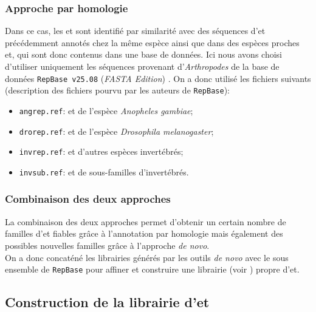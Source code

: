 \documentclass[10pt]{article}
\begin{document}
\subsubsection{Approche par homologie}\label{sec:homology}

Dans ce cas, les \acrshort{et} sont identifié par similarité avec des séquences d'\acrshort{et} précédemment annotés chez la même espèce ainsi que dans des espèces proches et, qui sont donc contenus dans une base de données. Ici nous avons choisi d'utiliser uniquement les séquences provenant d'\textit{Arthropodes} de la base de données \texttt{RepBase v25.08} (\textit{FASTA Edition}) \cite{jurka_repbase_2005}. On a donc utilisé les fichiers suivants (description des fichiers pourvu par les auteurs de \texttt{RepBase}): \\

\begin{itemize}
    \item[\ding{42}] \texttt{angrep.ref}: \acrshort{et} de l'espèce \textit{Anopheles gambiae};
    \item[\ding{42}] \texttt{drorep.ref}: \acrshort{et} de l'espèce \textit{Drosophila melanogaster};
    \item[\ding{42}] \texttt{invrep.ref}: \acrshort{et} d'autres espèces invertébrés;
    \item[\ding{42}] \texttt{invsub.ref}: \acrshort{et} de sous-familles d'invertébrés.
\end{itemize}


\subsubsection{Combinaison des deux approches}

La combinaison des deux approches permet d'obtenir un certain nombre de familles d'\acrshort{et} fiables grâce à l'annotation par homologie  mais également des possibles nouvelles familles grâce à l'approche \textit{de novo}. \\
On a donc concaténé les librairies générés par les outils \textit{de novo} avec le sous ensemble de \texttt{RepBase} pour affiner et construire une librairie (voir \subsectionautorefname{ \ref{subsec:lib_construction}}) propre d'\acrlong{et}.

\bigskip

\newpage

\subsection{Construction de la librairie d'\acrshort{et}}\label{subsec:lib_construction}
\end{document}

